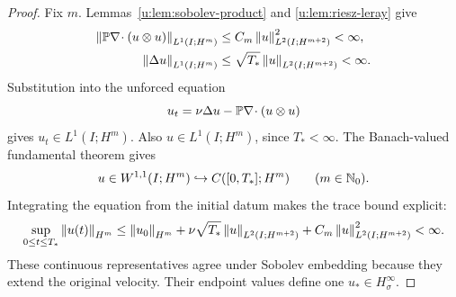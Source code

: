 \begin{proof}
Fix \(m\). Lemmas~\ref{u:lem:sobolev-product} and \ref{u:lem:riesz-leray}
give
\[
 \begin{aligned}
 \left\lVert \mathbb P\nabla\!\cdot(u\otimes u)\right\rVert_{L^1(I;H^m)}
 &\le C_m\left\lVert u\right\rVert_{L^2(I;H^{m+2})}^2<\infty,\\
 \left\lVert \Delta u\right\rVert_{L^1(I;H^m)}
 &\le\sqrt{T_*}\left\lVert u\right\rVert_{L^2(I;H^{m+2})}<\infty.
 \end{aligned}
\]
Substitution into the unforced equation
\[
 u_t=\nu\Delta u-\mathbb P\nabla\!\cdot(u\otimes u)
\]
gives \(u_t\in L^1(I;H^m)\). Also \(u\in L^1(I;H^m)\), since
\(T_*<\infty\). The Banach-valued fundamental theorem gives
\[
 u\in W^{1,1}(I;H^m)\hookrightarrow C([0,T_*];H^m)
 \qquad(m\in\mathbb N_0).
\]
Integrating the equation from the initial datum makes the trace bound explicit:
\[
 \sup_{0\le t\le T_*}\left\lVert u(t)\right\rVert_{H^m}
 \le\left\lVert u_0\right\rVert_{H^m}
 +\nu\sqrt{T_*}\left\lVert u\right\rVert_{L^2(I;H^{m+2})}
 +C_m\left\lVert u\right\rVert_{L^2(I;H^{m+2})}^2<\infty.
\]
These continuous representatives agree under Sobolev embedding because
they extend the original velocity. Their endpoint values define one
\(u_*\in H^\infty_\sigma\).


\end{proof}
